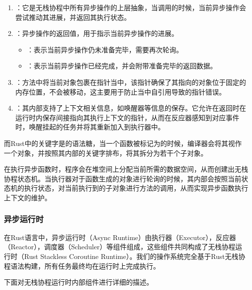 \documentclass{article}
\begin{document}
\begin{enumerate}
    \item {}：它是无栈协程中所有异步操作的上层抽象，当调用的时候，当前异步操作会尝试推动其进展，并返回其执行状态。
    \item {}：异步操作的返回值，用于指示当前异步操作的进展。
    \begin{itemize}
        \item {}：表示当前异步操作仍未准备完毕，需要再次轮询。
        \item {}：表示当前异步操作已经完成，并会附带准备完毕的返回数据。
    \end{itemize}
    \item {}：方法中将当前对象包裹在指针当中，该指针确保了其指向的对象位于固定的内存位置，不会被移动，这主要用于防止当中自引用导致的指针错误。
    \item {}：其内部支持了上下文相关信息，如唤醒器等信息的保存。它允许在返回时在运行时内保存间接指向其执行上下文的指针，从而在反应器感知到对应事件时，唤醒挂起的任务并将其重新加入到执行器中。
\end{enumerate}

而Rust中的关键字是的语法糖，当一个函数被标记为的时候，编译器会将其视作一个对象，并按照其内部的关键字排布，将其拆分为若干个子对象。

在执行异步函数时，程序会在堆空间上分配当前所需的数据空间，从而创建出无栈协程状态机。当执行器对于函数生成的对象进行轮询的时候，其内部会按照当前状态机的执行状态，对当前执行到的子对象进行方法的调用，从而实现异步函数执行上下文的维护。

\subsubsection{异步运行时} \label{sec:async_runtime}

在Rust语言中，异步运行时（Async Runtime）由执行器（Executor），反应器（Reactor），调度器（Scheduler）等组件组成，这些组件共同构成了无栈协程运行时（Rust Stackless Coroutine Runtime）。我们的操作系统完全基于Rust无栈协程语法构建，所有任务最终均在运行时上完成执行。

下面对无栈协程运行时内部组件进行详细的描述。
\end{document}
